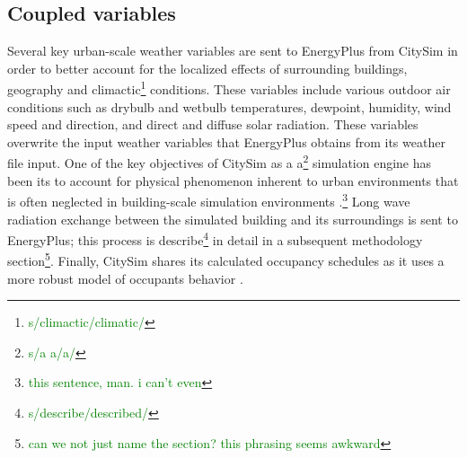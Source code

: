 \documentclass{tBPS2e}
\theoremstyle{plain}
\theoremstyle{definition}
\theoremstyle{remark}
\newcommand{\noteDT}[1]{\footnote{\textcolor{green}{#1}}}
\begin{document}


\subsection{Coupled variables}

Several key urban-scale weather variables are sent to EnergyPlus from CitySim in order to better account for the localized effects of surrounding buildings, geography and climactic\noteDT{s/climactic/climatic/} conditions. These variables include various outdoor air conditions such as drybulb and wetbulb temperatures, dewpoint, humidity, wind speed and direction, and direct and diffuse solar radiation. These variables overwrite the input weather variables that EnergyPlus obtains from its weather file input. One of the key objectives of CitySim as a a\noteDT{s/a a/a/} simulation engine has been its to account for physical phenomenon inherent to urban environments that is often neglected in building-scale simulation environments \citep{Robinson:2004cr,Robinson:2009tm}.\noteDT{this sentence, man. i can't even} Long wave radiation exchange between the simulated building and its surroundings is sent to EnergyPlus; this process is describe\noteDT{s/describe/described/} in detail in a subsequent methodology section\noteDT{can we not just name the section? this phrasing seems awkward}. Finally, CitySim shares its calculated occupancy schedules as it uses a more robust model of occupants behavior \citep{Haldi:2011dr}.
\end{document}
